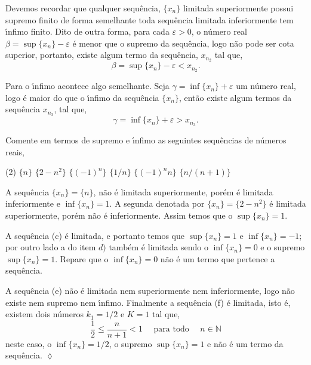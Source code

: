 \begin{note}
Devemos recordar que qualquer sequ\^{e}ncia, $\{x_n\}$  limitada superiormente possui supremo finito de forma semelhante toda sequ\^{e}ncia limitada inferiormente tem \'{\i}nfimo finito.  Dito de outra forma, para cada $\varepsilon>0$, o n\'{u}mero real $\beta=\sup\{x_n\}-\varepsilon$ \'{e} menor que o supremo da sequ\^{e}ncia, logo n\~{a}o pode ser cota superior, portanto, existe algum termo da sequ\^{e}ncia, $x_{n_2}$ tal que,
\begin{equation}\label{sup001}
    \beta=\sup\{ x_n\}-\varepsilon <x_{n_2}.
\end{equation}

Para o \'{\i}nfimo acontece algo semelhante. Seja $\gamma=\inf\{x_n\}+\varepsilon$ um n\'{u}mero real, logo \'{e} maior do que o \'{\i}nfimo da sequ\^{e}ncia $\{x_n\}$, ent\~{a}o existe algum termos da sequ\^{e}ncia $x_{n_3}$, tal que,
\begin{equation}\label{sup002}
    \gamma=\inf\{ x_n\}+\varepsilon > x_{n_3}.
\end{equation}
\end{note}

\begin{exer}
Comente em termos de supremo e \'{\i}nfimo as seguintes sequ\^{e}ncias de n\'{u}meros reais,
\begin{tasks}[label=\rm{(\alph*)},item-indent=3em,label-width=4ex,ref=(\alph*)](2)
    \task   \(\{n\}\)
    \task   \(\{2-n^2\}\)
    \task    \(\{(-1)^n\}\) 
    \task   \(\{1/n\}\)
    \task   \(\{(-1)^nn\}\)
    \task  \(\{n/(n+1)\}\)
\end{tasks}
\end{exer}

\solo A sequ\^{e}ncia $\{x_n\}=\{n\}$, n\~{a}o \'{e} limitada superiormente, por\'{e}m \'{e} limitada inferiormente e $\inf\{x_n\}=1$. A segunda \seq denotada por $\{x_n\}=\{ 2-n^2\}$ \'{e} limitada superiormente, por\'{e}m n\~{a}o \'{e} inferiormente. Assim temos que o $\sup\{x_n\}=1$.

A sequ\^{e}ncia (c) \'{e} limitada, e portanto temos que $\sup\{x_n\}=1$ e $\inf\{x_n\}=-1$; por outro lado a \seq do item $d)$ tamb\'{e}m \'{e} limitada sendo o  $\inf\{x_n\}=0$ e o supremo  $\sup\{x_n\}=1$. Repare que o $\inf\{x_n\}=0$ n\~{a}o \'{e} um termo que pertence a sequ\^{e}ncia.

A sequ\^{e}ncia (e) n\~{a}o \'{e} limitada nem superiormente nem inferiormente, logo n\~{a}o existe nem supremo nem \'{\i}nfimo. Finalmente a sequ\^{e}ncia (f) \'{e} limitada, isto \'{e}, existem dois n\'{u}meros $k_1=1/2$ e $K=1$ tal que,
\begin{equation*}
    \frac{1}{2}\leq \frac{n}{n+1}<1 \quad \text{ para todo }\quad n\in \mathbb{N}
\end{equation*}
neste caso, o $\inf\{x_n\}=1/2$, o supremo $\sup\{x_n\}=1$ e n\~{a}o \'{e} um termo da sequ\^{e}ncia. \hfill \(\lozenge\)

